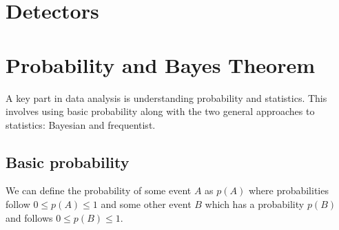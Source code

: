 \section{\label{intro:detector}Detectors}


\section{\label{intro:prob}Probability and Bayes Theorem}

A key part in data analysis is understanding probability and statistics. This involves using basic probability along with the two general approaches to statistics: Bayesian and frequentist. 

\subsection{\label{intro:prob:basic}Basic probability}

We can define the probability of some event $A$ as $p(A)$ where probabilities follow $0 \leq p(A) \leq 1$ and some other event $B$ which has a probability $p(B)$ and follows $0 \leq p(B) \leq 1$.

